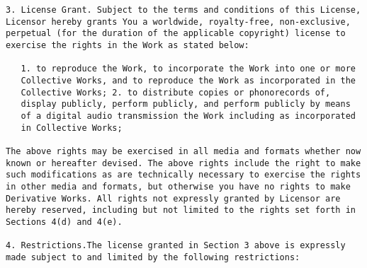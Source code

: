 \begin{lstlisting}[firstnumber=1,]
3. License Grant. Subject to the terms and conditions of this License,
Licensor hereby grants You a worldwide, royalty-free, non-exclusive,
perpetual (for the duration of the applicable copyright) license to
exercise the rights in the Work as stated below:

   1. to reproduce the Work, to incorporate the Work into one or more
   Collective Works, and to reproduce the Work as incorporated in the
   Collective Works; 2. to distribute copies or phonorecords of,
   display publicly, perform publicly, and perform publicly by means
   of a digital audio transmission the Work including as incorporated
   in Collective Works;

The above rights may be exercised in all media and formats whether now
known or hereafter devised. The above rights include the right to make
such modifications as are technically necessary to exercise the rights
in other media and formats, but otherwise you have no rights to make
Derivative Works. All rights not expressly granted by Licensor are
hereby reserved, including but not limited to the rights set forth in
Sections 4(d) and 4(e).

4. Restrictions.The license granted in Section 3 above is expressly
made subject to and limited by the following restrictions:


\end{lstlisting}
